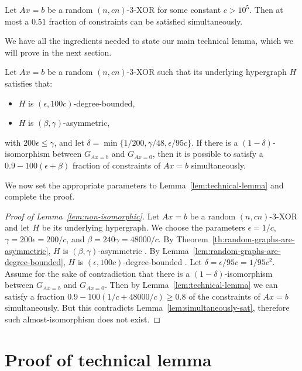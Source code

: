 \documentclass[a4paper,twoside,justified]{tufte-handout}
\newcommand{\Glin}[1]{G_{Ax=#1}}
\begin{document}
\begin{lemma}
  \label{lem:simultaneously-sat}
  Let $Ax=b$ be a random $(n,cn)$-3-XOR for some constant $c > 10^5$. Then at most a $0.51$ fraction of constraints can be satisfied simultaneously.
\end{lemma}

We have all the ingredients needed to state our main technical lemma, which we will prove in the next section.

\begin{lemma}
  \label{lem:technical-lemma}
  Let $Ax=b$ be a random $(n,cn)$-3-XOR such that its underlying hypergraph $H$ satisfies that:
  \begin{itemize}
  \item $H$ is $(\epsilon, 100c)$-degree-bounded,
  \item $H$ is $(\beta, \gamma)$-asymmetric,
  \end{itemize}
  with $200 \epsilon \leq \gamma$, and let $\delta = \min\{1/200, \gamma/48, \epsilon / 95c\}$. If there is a $(1-\delta)$-isomorphism between $\Glin{b}$ and $\Glin{0}$, then it is possible to satisfy a $0.9 - 100(\epsilon + \beta)$ fraction of constraints of $Ax=b$ simultaneously.
\end{lemma}

We now set the appropriate parameters to Lemma~\ref{lem:technical-lemma} and complete the proof.

\begin{proof}[Proof of Lemma~\ref{lem:non-isomorphic}]
  Let $Ax=b$ be a random $(n,cn)$-3-XOR and let $H$ be its underlying hypergraph. We choose the parameters $\epsilon = 1/c$, $\gamma = 200\epsilon = 200/c$, and $\beta = 240 \gamma = 48000/c$. By Theorem~\ref{th:random-graphs-are-asymmetric}, $H$ is $(\beta,\gamma)$-asymmetric \whp. By Lemma~\ref{lem:random-graphs-are-degree-bounded}, $H$ is $(\epsilon,100c)$-degree-bounded \whp. Let $\delta = \epsilon / 95c = 1/95c^2$. Assume for the sake of contradiction that there is a $(1-\delta)$-isomorphism between $\Glin{b}$ and $\Glin{0}$. Then by Lemma~\ref{lem:technical-lemma} we can satisfy a fraction $0.9-100(1/c+48000/c) \geq 0.8$ of the constraints of $Ax=b$ simultaneously. But this contradicts Lemma~\ref{lem:simultaneously-sat}, therefore such almost-isomorphism does not exist.
\end{proof}

\section{Proof of technical lemma}
\end{document}
